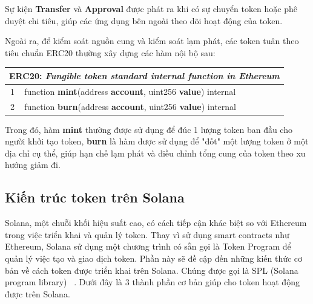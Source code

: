 \hspace{-1cm}Sự kiện \textbf{Transfer} và \textbf{Approval} được phát ra khi có
sự chuyển token hoặc phê duyệt chi tiêu, giúp các ứng dụng bên ngoài theo dõi
hoạt động của token.

\hspace{-1cm}Ngoài ra, để kiểm soát nguồn cung và kiểm soát lạm phát, các token
tuân theo tiêu chuẩn ERC20 thường xây dựng các hàm nội bộ sau:

\begin{center}
    \begin{tabular}{c p{}}
        \hline
        \multicolumn{2}{l}{\textbf{ERC20:} \textit{Fungible token standard
                internal
                function in Ethereum}}
        \\ \hline
        1 & \hspace{1em} function \textbf{mint}(address \textbf{account},
        uint256
        \textbf{value}) internal
        \\
        2 & \hspace{1em} function \textbf{burn}(address \textbf{account},
        uint256
        \textbf{value}) internal
        \\
        \hline
    \end{tabular}
\end{center}

\hspace{-1cm}Trong đó, hàm \textbf{mint} thường được sử dụng để đúc 1 lượng
token ban đầu cho người khởi tạo token, \textbf{burn} là hàm được sử dụng để
"đốt" một lượng token ở một địa chỉ cụ thể, giúp hạn chế lạm phát và điều chỉnh
tổng cung của token theo xu hướng giảm đi.

\subsection{Kiến trúc token trên Solana}
\hspace{1cm}Solana, một chuỗi khối hiệu suất cao, có cách tiếp cận khác biệt so
với Ethereum trong việc triển khai và quản lý token. Thay vì sử dụng smart
contracts như Ethereum, Solana sử dụng một chương trình có sẵn gọi là Token
Program để quản lý việc tạo và giao dịch token. Phần này sẽ đề cập đến những
kiến thức cơ bản về cách token được triển khai trên Solana. Chúng được gọi là
SPL (Solana program library) ~\cite{SPL}. Dưới đây là 3 thành phần cơ bản giúp
cho token hoạt động được trên Solana.


